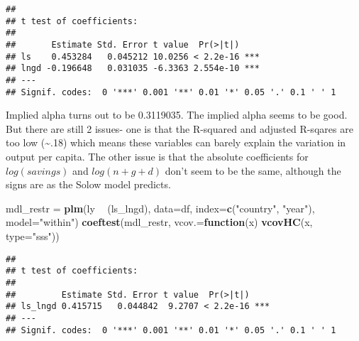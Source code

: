 \documentclass[]{article}
\newenvironment{Shaded}{\begin{snugshade}}{\end{snugshade}}
\newcommand{\KeywordTok}[1]{\textcolor[rgb]{0.13,0.29,0.53}{\textbf{#1}}}
\newcommand{\DataTypeTok}[1]{\textcolor[rgb]{0.13,0.29,0.53}{#1}}
\newcommand{\DecValTok}[1]{\textcolor[rgb]{0.00,0.00,0.81}{#1}}
\newcommand{\StringTok}[1]{\textcolor[rgb]{0.31,0.60,0.02}{#1}}
\newcommand{\ControlFlowTok}[1]{\textcolor[rgb]{0.13,0.29,0.53}{\textbf{#1}}}
\newcommand{\OperatorTok}[1]{\textcolor[rgb]{0.81,0.36,0.00}{\textbf{#1}}}
\newcommand{\NormalTok}[1]{#1}
\begin{document}
\begin{verbatim}
## 
## t test of coefficients:
## 
##       Estimate Std. Error t value  Pr(>|t|)    
## ls    0.453284   0.045212 10.0256 < 2.2e-16 ***
## lngd -0.196648   0.031035 -6.3363 2.554e-10 ***
## ---
## Signif. codes:  0 '***' 0.001 '**' 0.01 '*' 0.05 '.' 0.1 ' ' 1
\end{verbatim}

\begin{Shaded}
\end{Shaded}

Implied alpha turns out to be 0.3119035. The implied alpha seems to be
good. But there are still 2 issues- one is that the R-squared and
adjusted R-sqares are too low (\textasciitilde{}.18) which means these
variables can barely explain the variation in output per capita. The
other issue is that the absolute coefficients for \(log(savings)\) and
\(log(n + g + d)\) don't seem to be the same, although the signs are as
the Solow model predicts.

\begin{Shaded}
\begin{Highlighting}[]
\NormalTok{mdl_restr =}\StringTok{ }\KeywordTok{plm}\NormalTok{(ly }\OperatorTok{~}\StringTok{ }\NormalTok{(ls_lngd), }\DataTypeTok{data=}\NormalTok{df, }\DataTypeTok{index=}\KeywordTok{c}\NormalTok{(}\StringTok{"country"}\NormalTok{, }\StringTok{"year"}\NormalTok{), }\DataTypeTok{model=}\StringTok{"within"}\NormalTok{)}
\KeywordTok{coeftest}\NormalTok{(mdl_restr, }\DataTypeTok{vcov.=}\ControlFlowTok{function}\NormalTok{(x) }\KeywordTok{vcovHC}\NormalTok{(x, }\DataTypeTok{type=}\StringTok{"sss"}\NormalTok{))}
\end{Highlighting}
\end{Shaded}

\begin{verbatim}
## 
## t test of coefficients:
## 
##         Estimate Std. Error t value  Pr(>|t|)    
## ls_lngd 0.415715   0.044842  9.2707 < 2.2e-16 ***
## ---
## Signif. codes:  0 '***' 0.001 '**' 0.01 '*' 0.05 '.' 0.1 ' ' 1
\end{verbatim}

\begin{Shaded}
\end{Shaded}
\end{document}

